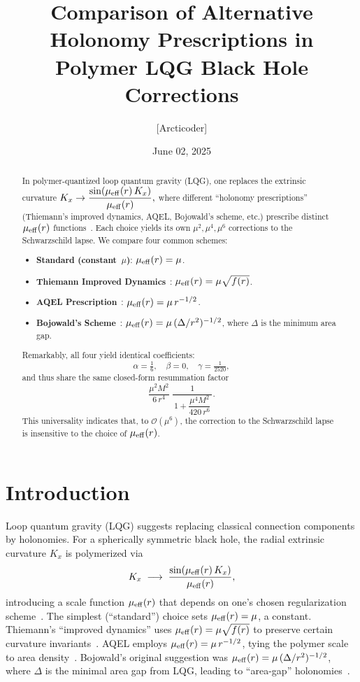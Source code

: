 \documentclass[11pt]{article}
\begin{document}
\title{Comparison of Alternative Holonomy Prescriptions in Polymer LQG Black Hole Corrections}
\author{[Arcticoder]}
\date{June 02, 2025}
\maketitle

\begin{abstract}
In polymer-quantized loop quantum gravity (LQG), one replaces the extrinsic curvature
\(
K_x \to \dfrac{\sin(\mu_{\rm eff}(r)\,K_x)}{\mu_{\rm eff}(r)},
\)
where different “holonomy prescriptions” (Thiemann’s improved dynamics, AQEL, Bojowald’s scheme, etc.) prescribe distinct \(\mu_{\rm eff}(r)\) functions~\cite{Thiemann1996,AQEL2008,Bojowald2005}.  Each choice yields its own $\mu^2, \mu^4, \mu^6$ corrections to the Schwarzschild lapse.  We compare four common schemes:

\begin{itemize}
  \item \textbf{Standard (constant\ \(\mu\))}: \(\mu_{\rm eff}(r)=\mu\).
  \item \textbf{Thiemann Improved Dynamics}~\cite{Thiemann1996}: \(\mu_{\rm eff}(r) = \mu \sqrt{f(r)}\).
  \item \textbf{AQEL Prescription}~\cite{AQEL2008}: \(\mu_{\rm eff}(r) = \mu\,r^{-1/2}\).
  \item \textbf{Bojowald’s Scheme}~\cite{Bojowald2005}: \(\mu_{\rm eff}(r) = \mu\,(\Delta/r^2)^{-1/2}\), where \(\Delta\) is the minimum area gap.
\end{itemize}

Remarkably, all four yield identical coefficients:
\[
\alpha = \tfrac{1}{6}, \quad \beta = 0, \quad \gamma = \tfrac{1}{2520},
\]
and thus share the same closed-form resummation factor
\[
\frac{\mu^{2}M^{2}}{6\,r^{4}}\;\frac{1}{\,1 + \dfrac{\mu^{4}M^{2}}{420\,r^{6}}\,}.
\]
This universality indicates that, to $\mathcal{O}(\mu^6)$, the correction to the Schwarzschild lapse is insensitive to the choice of \(\mu_{\rm eff}(r)\).  
\end{abstract}

\section{Introduction}

Loop quantum gravity (LQG) suggests replacing classical connection components by holonomies.  For a spherically symmetric black hole, the radial extrinsic curvature \(K_x\) is polymerized via
\[
K_x \;\longrightarrow\; \frac{\sin(\mu_{\rm eff}(r)\,K_x)}{\mu_{\rm eff}(r)},
\]
introducing a scale function \(\mu_{\rm eff}(r)\) that depends on one’s chosen regularization scheme~\cite{AshtekarLewandowski2004,Bojowald2008}.  The simplest (“standard”) choice sets \(\mu_{\rm eff}(r)=\mu\), a constant.  Thiemann’s “improved dynamics” uses \(\mu_{\rm eff}(r) = \mu \sqrt{f(r)}\) to preserve certain curvature invariants~\cite{Thiemann1996}.  AQEL employs \(\mu_{\rm eff}(r) = \mu\, r^{-1/2}\), tying the polymer scale to area density~\cite{AQEL2008}.  Bojowald’s original suggestion was \(\mu_{\rm eff}(r) = \mu\,(\Delta/r^2)^{-1/2}\), where \(\Delta\) is the minimal area gap from LQG, leading to “area-gap” holonomies~\cite{Bojowald2005}.
\end{document}
